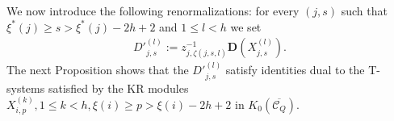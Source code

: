 \documentclass[12pt]{amsart}
\theoremstyle{plain}
\newtheorem{proposition}[theorem]{Proposition}
\theoremstyle{definition}
\numberwithin{equation}{section}
\newcommand{\CQ}{\mathcal{C}_Q}
\newcommand{\xistar}{\xi^{*}}
\begin{document}






   We now introduce the following renormalizations: for every $(j,s)$ such that $\xistar(j) \geq s > \xistar(j)-2h+2$ and $1 \leq l < h$ we set 
\begin{align} \label{eq:def of Dprimejs}
{D'}_{j,s}^{(l)} := z_{j, \zeta(j,s,l)}^{-1} \mathbf{D} \left( X_{j,s}^{(l)} \right).
\end{align}    
The next Proposition shows that the ${D'}_{j,s}^{(l)}$ satisfy identities dual to the T-systems satisfied by the KR modules $X_{i,p}^{(k)} , 1 \leq k <h, \xi(i) \geq p > \xi(i)-2h+2$ in $K_0(\overline{\CQ})$. 

\end{document}

